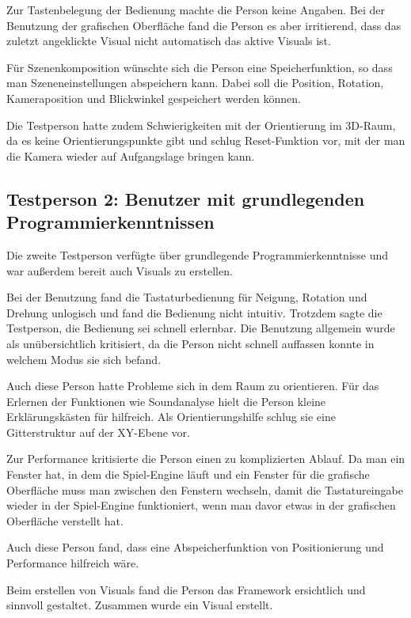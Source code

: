 Zur Tastenbelegung der Bedienung machte die Person keine Angaben. Bei der Benutzung der grafischen Oberfl\"ache fand die
Person es aber irritierend, dass das zuletzt angeklickte Visual nicht automatisch das aktive Visuals ist.

F\"ur Szenenkomposition w\"unschte sich die Person eine Speicherfunktion, so dass man Szeneneinstellungen abspeichern kann.
Dabei soll die Position, Rotation, Kameraposition und Blickwinkel gespeichert werden k\"onnen.

Die Testperson hatte zudem Schwierigkeiten mit der Orientierung im 3D-Raum, da es keine Orientierungspunkte gibt und 
schlug Reset-Funktion vor, mit der man die Kamera wieder auf Aufgangslage bringen kann.

\subsection{Testperson 2: Benutzer mit grundlegenden Programmierkenntnissen}

Die zweite Testperson verf\"ugte \"uber grundlegende Programmierkenntnisse und war au\ss{}erdem bereit auch Visuals zu 
erstellen.

Bei der Benutzung fand die Tastaturbedienung f\"ur Neigung, Rotation und Drehung unlogisch und fand die Bedienung 
nicht intuitiv. Trotzdem sagte die Testperson, die Bedienung sei schnell erlernbar. Die Benutzung allgemein wurde 
als un\"ubersichtlich kritisiert, da die Person nicht schnell auffassen konnte in welchem Modus sie sich befand.

Auch diese Person hatte Probleme sich in dem Raum zu orientieren. F\"ur das Erlernen der Funktionen wie Soundanalyse
hielt die Person kleine Erkl\"arungsk\"asten f\"ur hilfreich. Als Orientierungshilfe schlug sie eine Gitterstruktur auf
der XY-Ebene vor.

Zur Performance kritisierte die Person einen zu komplizierten Ablauf. Da man ein Fenster hat, in dem die Spiel-Engine
l\"auft und ein Fenster f\"ur die grafische Oberfl\"ache muss man zwischen den Fenstern wechseln, damit die Tastatureingabe
wieder in der Spiel-Engine funktioniert, wenn man davor etwas in der grafischen Oberfl\"ache verstellt hat.

Auch diese Person fand, dass eine Abspeicherfunktion von Positionierung und Performance hilfreich w\"are.

Beim erstellen von Visuals fand die Person das Framework ersichtlich und sinnvoll gestaltet. Zusammen wurde ein Visual
erstellt.

